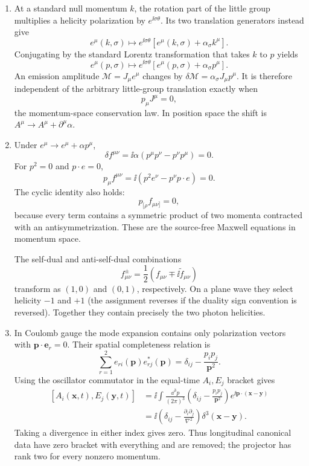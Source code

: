 \begin{enumerate}
\begin{enumerate}
\item
At a standard null momentum \(k\), the rotation part of the little group
multiplies a helicity polarization by \(e^{\ii\sigma\theta}\).  Its two
translation generators instead give
\[
 e^\mu(k,\sigma)\longmapsto
 e^{\ii\sigma\theta}\left[e^\mu(k,\sigma)+\alpha_\sigma k^\mu\right].
\]
Conjugating by the standard Lorentz transformation that takes \(k\) to
\(p\) yields
\[
 e^\mu(p,\sigma)\longmapsto
 e^{\ii\sigma\theta}\left[e^\mu(p,\sigma)+\alpha_\sigma p^\mu\right].
\]
An emission amplitude \(\mathcal M=J_\mu e^\mu\) changes by
\(\delta\mathcal M=\alpha_\sigma J_\mu p^\mu\).  It is therefore independent
of the arbitrary little-group translation exactly when
\[
 p_\mu J^\mu=0,
\]
the momentum-space conservation law.  In position space the shift is
\(A^\mu\to A^\mu+\partial^\mu\alpha\).
\item
Under \(e^\mu\to e^\mu+\alpha p^\mu\),
\[
 \delta f^{\mu\nu}
 =\ii\alpha(p^\mu p^\nu-p^\nu p^\mu)=0.
\]
For \(p^2=0\) and \(p\cdot e=0\),
\[
 p_\mu f^{\mu\nu}
 =\ii(p^2e^\nu-p^\nu p\cdot e)=0.
\]
The cyclic identity also holds:
\[
 p_{[\rho}f_{\mu\nu]}=0,
\]
because every term contains a symmetric product of two momenta contracted
with an antisymmetrization.  These are the source-free Maxwell equations in
momentum space.

The self-dual and anti-self-dual combinations
\[
 f^\pm_{\mu\nu}=\frac12(f_{\mu\nu}\mp \ii\widetilde f_{\mu\nu})
\]
transform as \((1,0)\) and \((0,1)\), respectively.  On a plane wave they
select helicity \(-1\) and \(+1\) (the assignment reverses if the duality
sign convention is reversed).  Together they contain precisely the two
photon helicities.
\item
In Coulomb gauge the mode expansion contains only polarization vectors with
\(\mathbf p\cdot\mathbf e_r=0\).  Their spatial completeness relation is
\[
 \sum_{r=1}^{2}e_{r i}(\mathbf p)e_{r j}^*(\mathbf p)
 =\delta_{ij}-\frac{p_ip_j}{\mathbf p^2}.
\]
Using the oscillator commutator in the equal-time \(A_i,E_j\) bracket gives
\[
\begin{split}
 [A_i(\mathbf x,t),E_j(\mathbf y,t)]
 &=\ii\int\frac{\dd^3p}{(2\pi)^3}
 \left(\delta_{ij}-\frac{p_ip_j}{\mathbf p^2}\right)
 e^{\ii\mathbf p\cdot(\mathbf x-\mathbf y)}\\
 &=\ii\left(\delta_{ij}-\frac{\partial_i\partial_j}{\nabla^2}\right)
 \delta^3(\mathbf x-\mathbf y).
\end{split}
\]
Taking a divergence in either index gives zero.  Thus longitudinal canonical
data have zero bracket with everything and are removed; the projector has
rank two for every nonzero momentum.
\end{enumerate}


\end{enumerate}
